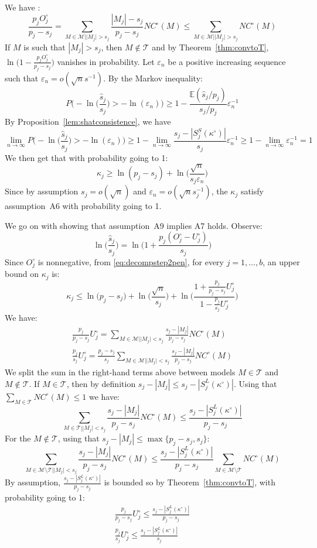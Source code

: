 \documentclass[aos]{imsart}
\theoremstyle{plain}
\newcommand{\E}{\mathbb{E}}
\newcommand{\M}{\mathcal{M}}
\newcommand{\T}{\mathcal{T}}
\begin{document}
We have :
$$\frac{p_j O^{\circ}_j}{p_j-s_j} =  \sum_{M \in \M | |M_j| > s_j}\frac{|M_j|-s_j}{p_j-s_j}NC^{\circ}(M)\leq \sum_{M \in \M | |M_j| > s_j}NC^{\circ}(M)$$ 
If $M$ is such that $|M_j|>s_j$, then $M\not\in\T$ and by Theorem~\ref{thm:convtoT}, $\ln\Big(1-\frac{p_j O^{\circ}_j}{p_j-s_j}\Big)$ vanishes in probability. 
Let $\varepsilon_n$ be a positive increasing sequence such that $\varepsilon_n=o(\sqrt{n}s^{-1})$. By the Markov inequality:
$$P\Big(-\ln\Big(\frac{\widehat{s}_j}{s_j}\Big)>-\ln(\varepsilon_n)\Big)\geq 1-\frac{\E(\widehat{s}_j/p_j)}{s_j/p_j} \varepsilon_n^{-1} $$
By Proposition~\ref{lem:shatconsistence}, we have
$$\lim_{n\to\infty}P\Big(-\ln\Big(\frac{\widehat{s}_j}{s_j}\Big)>-\ln(\varepsilon_n)\Big)\geq 1-\lim_{n\to\infty}\frac{s_j-|S^S_j(\kappa^{\circ})|}{s_j} \varepsilon_n^{-1} \geq 1-\lim_{n\to\infty}\varepsilon_n^{-1}=1  $$
We then get that with probability going to 1:
\begin{equation}\label{eq:finallowerboundkappaj}
  \kappa_j 
    \geq  \ln(p_j-s_j)+\ln\Big(\frac{\sqrt{n}}{s_j\varepsilon_n}\Big) 
\end{equation}
Since by assumption $s_j=o(\sqrt{n})$ and $\varepsilon_n=o(\sqrt{n}s_j^{-1})$, the $\kappa_j$ satisfy assumption~A6 with probability going to 1.

We go on with showing that assumption~A9 implies A7 holds. Observe:
$$\ln\Big(\frac{\widehat{s}_j}{s_j}\Big)=\ln\Big(1+\frac{p_j(O^{\circ}_j-U^{\circ}_j)}{s_j}\Big) $$
Since $O_j^{\circ}$ is nonnegative, from \eqref{eq:decompstep2pen}, for every $j=1,\ldots,b$, an upper bound on $\kappa_j$ is:
\begin{equation}\label{eq:gggggggg}
    \kappa_j \leq \ln\big(p_j-s_j\big)+\ln\Big(\frac{\sqrt{n}}{s_j}\Big)+\ln\bigg(\frac{1+\frac{p_j}{p_j-s_j}U^{\circ}_j}{1-\frac{p_j}{s_j}U^{\circ}_j}\bigg)
\end{equation}
We have:
\begin{align*}
    \frac{p_j}{p_j-s_j}U^{\circ}_j = \sum_{M \in \M | |M_j| < s_j}\frac{s_j-|M_j|}{p_j-s_j}NC^{\circ}(M) \\
    \frac{p_j}{s_j}U^{\circ}_j = \frac{p_j-s_j}{s_j} \sum_{M \in \M | |M_j| < s_j}\frac{s_j-|M_j|}{p_j-s_j}NC^{\circ}(M)
\end{align*}
We split the sum in the right-hand terms above between models $M\in \T$ and $M\not\in \T$. If $M\in \T$, then by definition $s_j-|M_j|\leq s_j-|S^L_j(\kappa^{\circ})|$. Using that $ \sum_{M \in \T}NC^{\circ}(M)\leq 1$ we have: 
$$ \sum_{M \in \T | |M_j| < s_j}\frac{s_j-|M_j|}{p_j-s_j}NC^{\circ}(M) \leq \frac{s_j-|S^L_j(\kappa^{\circ})|}{p_j-s_j}$$
For the $M\not\in \T$, using that $s_j-|M_j|\leq\max\{p_j-s_j,s_j\}$:
$$\sum_{M \in \M\setminus \T | |M_j| < s_j}\frac{s_j-|M_j|}{p_j-s_j}NC^{\circ}(M) \leq \frac{s_j-|S^L_j(\kappa^{\circ})|}{p_j-s_j}\sum_{M \in \M\setminus \T }NC^{\circ}(M)$$
By assumption, $\frac{s_j-|S^L_j(\kappa^{\circ})|}{p_j-s_j}$ is bounded so by Theorem~\ref{thm:convtoT}, with probability going to 1:
\begin{align*}
    \frac{p_j}{p_j-s_j}U^{\circ}_j \leq \frac{s_j-|S^L_j(\kappa^{\circ})|}{p_j-s_j}\\
    \frac{p_j}{s_j}U^{\circ}_j \leq  \frac{s_j-|S^L_j(\kappa^{\circ})|}{s_j}
\end{align*}
\end{document}
